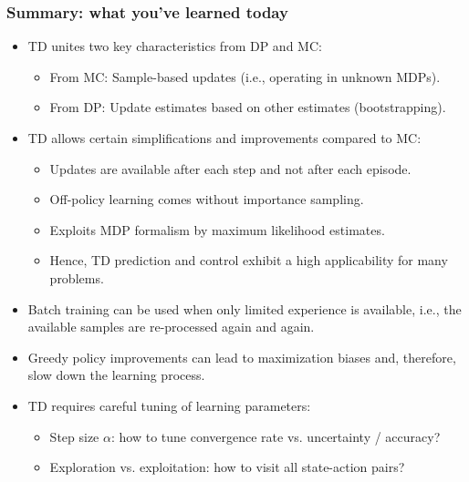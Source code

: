 \begin{frame}
\frametitle{Summary: what you've learned today}
\begin{itemize}
	\item TD unites two key characteristics from DP and MC:
	\begin{itemize}
		\item From MC: Sample-based updates (i.e., operating in unknown MDPs).
		\item From DP: Update estimates based on other estimates (bootstrapping).
	\end{itemize}\pause
	\item TD allows certain simplifications and improvements compared to MC:
	\begin{itemize}
		\item Updates are available after each step and not after each episode.\pause
		\item Off-policy learning comes without importance sampling.\pause
		\item Exploits MDP formalism by maximum likelihood estimates. \pause
		\item Hence, TD prediction and control exhibit a high applicability for many problems.\pause
	\end{itemize}
	\item Batch training can be used when only limited experience is available, i.e., the available samples are re-processed again and again.\pause
	\item Greedy policy improvements can lead to maximization biases and, therefore, slow down the learning process. \pause
	\item TD requires careful tuning of learning parameters:
	\begin{itemize}
		\item Step size $\alpha$: how to tune convergence rate vs. uncertainty / accuracy?
		\item Exploration vs. exploitation: how to visit all state-action pairs?
	\end{itemize}
\end{itemize}
\end{frame}
